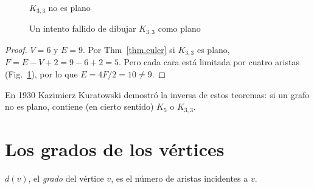 \begin{figure}[b]
\begin{minipage}{.45\textwidth}
\begin{center}
\caption{$K_{3,3}$ no es plano}\label{f.five-k33}
\end{center}
\end{minipage}
\hfill
\begin{minipage}{.45\textwidth}
\begin{center}
\caption{Un intento fallido de dibujar $K_{3,3}$ como plano}\label{f.five-k33-failed}
\end{center}
\end{minipage}
\end{figure}

\begin{proof}
$V=6$ y $E=9$. Por Thm~\ref{thm.euler} si $K_{3,3}$ es plano, $F=E-V+2=9-6+2=5$. Pero cada cara está limitada por cuatro aristas (Fig.~\ref{f.five-k33-failed}), por lo que $E=4F/2=10\neq 9$.
\end{proof}

En 1930 Kazimierz Kuratowski demostró la inversa de estos teoremas: si un grafo no es plano, contiene (en cierto sentido) $K_5$ o $K_{3,3}$.


\section{Los grados de los vértices}\label{s.degrees}

\begin{definition}
$d(v)$, el \emph{grado} del vértice $v$, es el número de aristas incidentes a $v$.
\end{definition}

